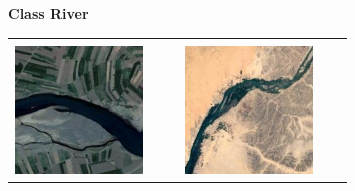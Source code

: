 \begin{figure}[h]
\centering
\textbf{Class River}

\begin{tabular}{|p{0.4\linewidth}p{0.4\linewidth}|}
\hline & \\
\includegraphics[width=\linewidth,frame]{figures/examples_assests/linear_probing/river_1.pdf} &
\includegraphics[width=\linewidth,frame]{figures/examples_assests/linear_probing/river_2.pdf} \\

\end{tabular}
\end{figure}
